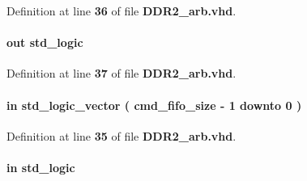 Definition at line {\bf 36} of file {\bf D\+D\+R2\+\_\+arb.\+vhd}.

\paragraph[{rcmd\+\_\+fifo\+\_\+rdreq}]{ {\bfseries \textcolor{keywordflow}{out}\textcolor{vhdlchar}{ }} {\bfseries \textcolor{comment}{std\+\_\+logic}\textcolor{vhdlchar}{ }} \hspace{0.3cm}{\ttfamily [Port]}}\label{classDDR2__arb_a872b2b3fc66a105111313fbd6108c7d5}


Definition at line {\bf 37} of file {\bf D\+D\+R2\+\_\+arb.\+vhd}.

\paragraph[{rcmd\+\_\+fifo\+\_\+rdusedw}]{ {\bfseries \textcolor{keywordflow}{in}\textcolor{vhdlchar}{ }} {\bfseries \textcolor{comment}{std\+\_\+logic\+\_\+vector}\textcolor{vhdlchar}{ }\textcolor{vhdlchar}{(}\textcolor{vhdlchar}{ }\textcolor{vhdlchar}{ }\textcolor{vhdlchar}{ }\textcolor{vhdlchar}{ }{\bfseries {\bf cmd\+\_\+fifo\+\_\+size}} \textcolor{vhdlchar}{-\/}\textcolor{vhdlchar}{ } \textcolor{vhdldigit}{1} \textcolor{vhdlchar}{ }\textcolor{keywordflow}{downto}\textcolor{vhdlchar}{ }\textcolor{vhdlchar}{ } \textcolor{vhdldigit}{0} \textcolor{vhdlchar}{ }\textcolor{vhdlchar}{)}\textcolor{vhdlchar}{ }} \hspace{0.3cm}{\ttfamily [Port]}}\label{classDDR2__arb_a9b050c3c19bc6b90bb36e84866dc4a6f}


Definition at line {\bf 35} of file {\bf D\+D\+R2\+\_\+arb.\+vhd}.

\paragraph[{reset\+\_\+n}]{ {\bfseries \textcolor{keywordflow}{in}\textcolor{vhdlchar}{ }} {\bfseries \textcolor{comment}{std\+\_\+logic}\textcolor{vhdlchar}{ }} \hspace{0.3cm}{\ttfamily [Port]}}\label{classDDR2__arb_a446ea52ed8c4a84181a47d9165ce41a5}


